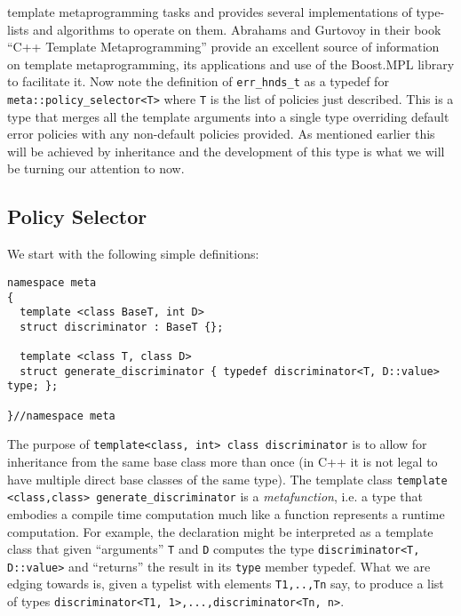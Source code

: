 \documentclass[a4paper,twoside,twocolumn]{article}
\begin{document}
template metaprogramming tasks and provides several implementations of
type-lists and algorithms to operate on them. Abrahams and Gurtovoy in
their book ``C++ Template Metaprogramming'' \citep{abrahams} provide an
excellent source of information on template metaprogramming, its
applications and use of the Boost.MPL library to facilitate it.
Now note the definition of \verb|err_hnds_t| as a typedef for
\verb|meta::policy_selector<T>| where \verb|T| is the list of
policies just described. This is a type that merges all the template
arguments into a single type overriding default error policies with
any non-default policies provided. As mentioned earlier this will be
achieved by inheritance and the development of this type is what we
will be turning our attention to now.

\subsection{Policy Selector}
We start with the following simple definitions:
\begin{verbatim}
namespace meta
{
  template <class BaseT, int D>
  struct discriminator : BaseT {};

  template <class T, class D>
  struct generate_discriminator { typedef discriminator<T, D::value> type; };

}//namespace meta
\end{verbatim}
The purpose of \verb|template<class, int> class discriminator| is to
allow for inheritance from the same base class more than once (in C++
it is not legal to have multiple direct base classes of the same
type). The template class \verb|template <class,class> generate_discriminator| 
is a \emph{metafunction}, i.e. a type that embodies a compile time
computation much like a function represents a runtime computation. For
example, the declaration might be interpreted as a template class that given
``arguments'' \verb|T| and \verb|D| computes the type
\verb|discriminator<T, D::value>| and ``returns'' the result in its
\verb|type| member typedef. What we are edging towards is, given a
typelist with elements \verb|T1,..,Tn| say, to produce a list of
types \verb|discriminator<T1, 1>,...,discriminator<Tn, n>|.
\end{document}
